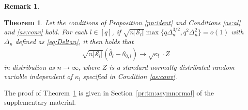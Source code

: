 \documentclass[12pt]{article}
\newtheorem{theorem}{Theorem}
\newtheorem{remark}{Remark}
\newcommand{\0}{{\bf 0}}
\begin{document}
\begin{remark}
\end{remark}



\begin{theorem}\label{tm:asymnormal}
Let the conditions of Proposition {\rm\ref{pn:ident}} and Conditions {\rm\ref{as:al}} and {\rm\ref{as:conv}} hold. For each $l\in[q]$, if $\sqrt{n|\mathcal{S}_l|}\max\{q\Delta_n^{3/2},q^2\Delta_{n}^2\}=o(1)$ with $\Delta_n$ defined as \eqref{eq:Deltan}, it then holds that
\begin{align*}
\sqrt{n|\mathcal{S}_l|}(\hat{\theta}_l-\theta_{0,l})\rightarrow\sqrt{\kappa_l}\cdot Z
 \end{align*}
in distribution as $n\rightarrow\infty$, where $Z$ is a standard normally distributed random variable independent of $\kappa_l$ specified in Condition {\rm\ref{as:conv}}.
\end{theorem}

The proof of Theorem~{\rm\ref{tm:asymnormal}}
is given in Section~{\rm\ref{pr:tm:asymnormal}} of the supplementary material.
\end{document}
